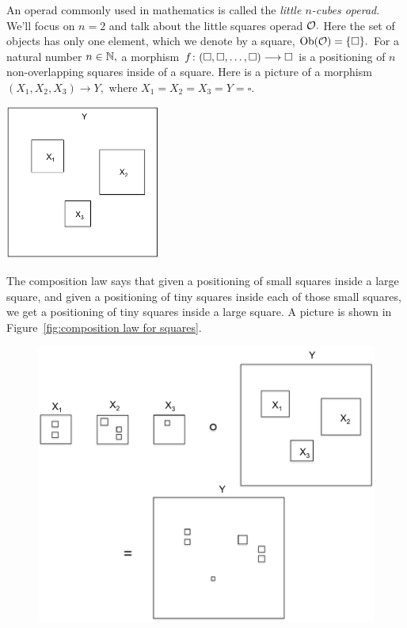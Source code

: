 \documentclass[../main/CT4S-EN-RU]{subfiles}
\begin{document}
\begin{exampleRUS}
\end{exampleRUS}

\begin{exampleENG}\label{ex:little squares}
An operad commonly used in mathematics is called the {\em little $n$-cubes operad}. We'll focus on $n=2$ and talk about the little squares operad $\mathcal{O}.$ Here the set of objects has only one element, which we denote by a square, $\operatorname{Ob}(\mathcal{O})=\{\square\}.$ For a natural number $n\in{\mathbb N},$ a morphism $f\colon(\square,\square,\ldots,\square)\longrightarrow\square$ is a positioning of $n$ non-overlapping squares inside of a square. Here is a picture of a morphism $(X_1,X_2,X_3)\to Y,$ where $X_1=X_2=X_3=Y=\square.$
\begin{center}
\includegraphics[height=2in]{square1}
\end{center}
The composition law says that given a positioning of small squares inside a large square, and given a positioning of tiny squares inside each of those small squares, we get a positioning of tiny squares inside a large square. A picture is shown in Figure~\ref{fig:composition law for squares}.
\begin{figure}[H]
\begin{center}
\includegraphics[width=\textwidth]{square2}

\end{center}
\end{figure}
\end{exampleENG}
\end{document}
